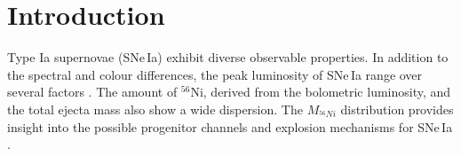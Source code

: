 \documentclass[traditabstract]{aa}
\begin{document}




\maketitle
\section{Introduction}
\label{sec-intro}

Type Ia supernovae (SNe\,Ia) exhibit diverse observable properties. In addition to the spectral and colour differences, the peak luminosity of SNe\,Ia  range over several factors \citep[e.g.][]{Suntzeff1996, Suntzeff2003, Li2011}. The amount of $^{56}$Ni, derived from the bolometric luminosity, \citep{Contardo2000} and the total ejecta mass \citep{Stritzinger2006a, Scalzo2014} also show a wide dispersion. The $M_{^{56}Ni}$ distribution provides insight into the possible progenitor channels and explosion mechanisms for SNe\,Ia \citep[see][]{Hillebrandt2000, Livio2000, Truran2012}.
\end{document}
